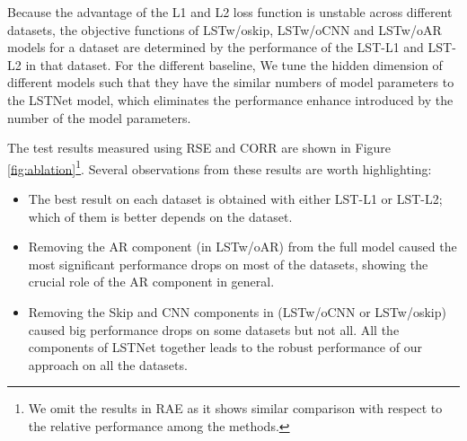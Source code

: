 Because the advantage of the L1 and L2 loss function is unstable across different datasets, the objective functions of LSTw/oskip, LSTw/oCNN and LSTw/oAR models for a dataset are determined by the performance of the LST-L1 and LST-L2 in that dataset. For the different baseline, We tune the hidden dimension of different models such that they have the similar numbers of model parameters to the LSTNet model, which eliminates the performance enhance introduced by the number of the model parameters.

The test results measured using RSE and CORR are shown in Figure \ref{fig:ablation}\footnote{We omit the results in RAE as it shows similar comparison with respect to the relative performance among the methods.}. Several observations from these results are worth highlighting:
\begin{itemize}
\item The best result on each dataset is obtained with either LST-L1 or LST-L2; which of them is better depends on the dataset.
\item Removing the AR component (in LSTw/oAR) from the full model caused the most significant performance drops on most of the datasets, showing the crucial role of the AR component in general.
\item Removing the Skip and CNN components in (LSTw/oCNN or LSTw/oskip) caused big performance drops on some datasets but not all. All the components of LSTNet together leads to the robust performance of our approach on all the datasets.
\end{itemize}



